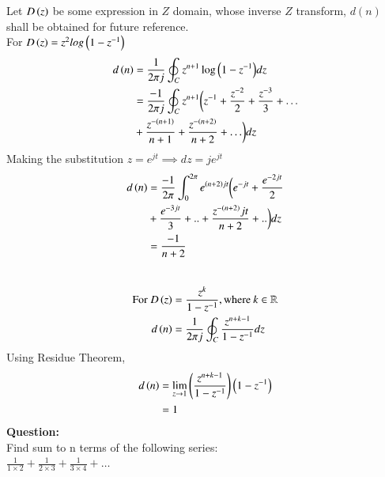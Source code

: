 \documentclass[journal,12pt,twocolumn]{IEEEtran}
\theoremstyle{remark}
\begin{document}
Let $D\left(z\right)$ be some expression in $Z$ domain, whose inverse $Z$ transform, $d(n)$ shall be obtained for future reference.\\
For $D\left(z\right)= z^{2}log\left(1-z^{-1}\right)$
\begin{align}
    d\left(n\right)&= \frac{1}{2\pi j} \oint _C z^{n+1}\log{\ensuremath{\left(1-z^{-1}\right)}}dz\\
    &=\frac{-1}{2\pi j} \oint _C z^{n+1}\biggl(z^{-1}+\frac{z^{-2}}{2} + \frac{z^{-3}}{3}+\ldots \notag\\ \;\: &+ \frac{z^{-(n+1)}}{n+1} +  \frac{z^{-\left(n+2\right)}}{n+2}+ \ldots \biggr) dz
\end{align}
Making the substitution $z=e^{jt} \implies dz = je^{jt}$
\begin{align}  
    d\left(n\right)&=\frac{-1}{2\pi} \int_{0}^{2\pi} e^{\left(n+2\right)jt}\biggl(e^{-jt}+\frac{e^{-2jt}}{2} \notag \\&+ \frac{e^{-3jt}}{3} +.. +\frac{z^{-\left(n+2\right)}jt}{n+2}+..\biggr) dz\\
    &=\frac{-1}{n+2}\label{11027_eq2}
\end{align}
\\
\begin{align}
    \notag \text{For }D\left(z\right)&= \frac{z^k}{1-z^{-1}},\text{where} \: k \in \mathbb{R}\\
    d\left(n\right)&=\frac{1}{2\pi j} \oint _C \frac{z^{n+k-1}}{1-z^{-1}}dz
\end{align}
Using Residue Theorem,
\begin{align}
    d\left(n\right)&= \lim_{z \to 1}\left(\frac{z^{n+k-1}}{1-z^{-1}}\right)\left({1-z^{-1}}\right) \\
    &= 1\label{11027_eq3}
\end{align}
\newpage
\textbf{Question:} \\
Find sum to n terms of the following series:\\
$\frac{1}{1 \times 2} + \frac{1}{2 \times 3} + \frac{1}{3 \times 4} + \ldots$
\bigskip \bigskip
\end{document}
